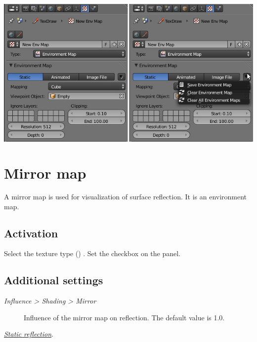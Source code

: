 \documentclass[a4paper,12pt,oneside]{sphinxmanual}
\begin{document}
{\hfill\includegraphics[width=1.000\linewidth]{environment_map_baking_ui.jpg}\hfill}


\section{Mirror map}
\label{textures:id19}\label{textures:mirror-map}\label{textures:index-11}
A mirror map is used for visualization of surface reflection. It is an environment map.


\subsection{Activation}
\label{textures:id20}
Select the  texture type () . Set the  checkbox on the  panel.


\subsection{Additional settings}
\label{textures:id21}\begin{description}
\item[{\emph{Influence \textgreater{} Shading \textgreater{} Mirror}}] \leavevmode
Influence of the mirror map on reflection. The default value is 1.0.

\end{description}




{\hyperref[materials:reflection-static]{\emph{Static reflection}}}.



\end{document}
